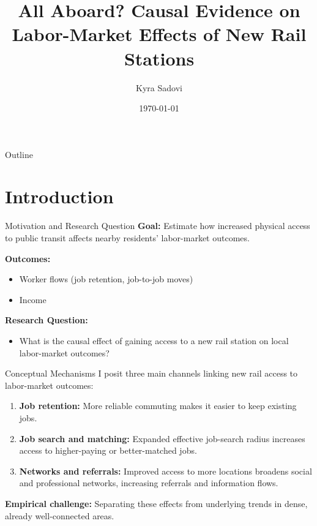 \documentclass{beamer}
\title[New Rail Stations and Labor Markets]{All Aboard? Causal Evidence on Labor-Market Effects of New Rail Stations}
\author{Kyra Sadovi}
\institute{University of Chicago Harris School of Public Policy \\
\href{mailto:ksadovi@uchicago.edu}{ksadovi@uchicago.edu}}
\date{\today}
\begin{document}
\begin{frame}[plain]
  \titlepage
\end{frame}

\begin{frame}[plain]{Outline}
  \tableofcontents
\end{frame}

\section{Introduction}
\begin{frame}{Motivation and Research Question}
\textbf{Goal:} Estimate how increased physical access to public transit affects nearby residents' labor-market outcomes.

\bigskip
\textbf{Outcomes:}
\begin{itemize}
    \item Worker flows (job retention, job-to-job moves)
    \item Income
\end{itemize}

\bigskip
\textbf{Research Question:}
\begin{itemize}
    \item What is the causal effect of gaining access to a new rail station on local labor-market outcomes?
\end{itemize}
\end{frame}

\begin{frame}{Conceptual Mechanisms}
\small
I posit three main channels linking new rail access to labor-market outcomes:
\begin{enumerate}
    \item \textbf{Job retention:} More reliable commuting makes it easier to keep existing jobs.
    \item \textbf{Job search and matching:} Expanded effective job-search radius increases access to higher-paying or better-matched jobs.
    \item \textbf{Networks and referrals:} Improved access to more locations broadens social and professional networks, increasing referrals and information flows.
\end{enumerate}

\bigskip
\textbf{Empirical challenge:} Separating these effects from underlying trends in dense, already well-connected areas.
\end{frame}
\end{document}
